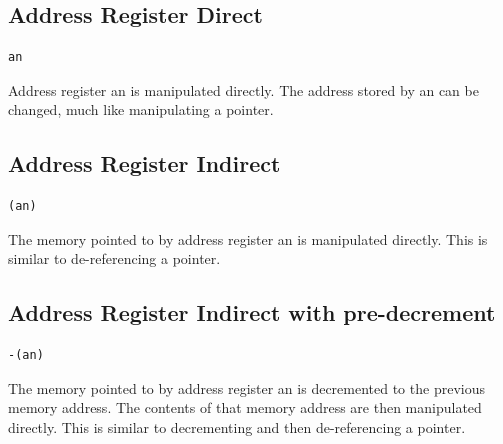 \documentclass[10pt,fullpage]{article}
\begin{document}
\subsection*{Address Register Direct}
\begin{verbatim}an\end{verbatim}
Address register an is manipulated directly. The address stored by
an can be changed, much like manipulating a pointer.

\subsection*{Address Register Indirect}
\begin{verbatim}(an)\end{verbatim}
The memory pointed to by address register an is manipulated
directly. This is similar to de-referencing a pointer.

\subsection*{Address Register Indirect with pre-decrement}
\begin{verbatim}-(an)\end{verbatim}
The memory pointed to by address register an is decremented to the
previous memory address. The contents of that memory address are
then manipulated directly. This is similar to decrementing and then
de-referencing a pointer.


\end{document}
